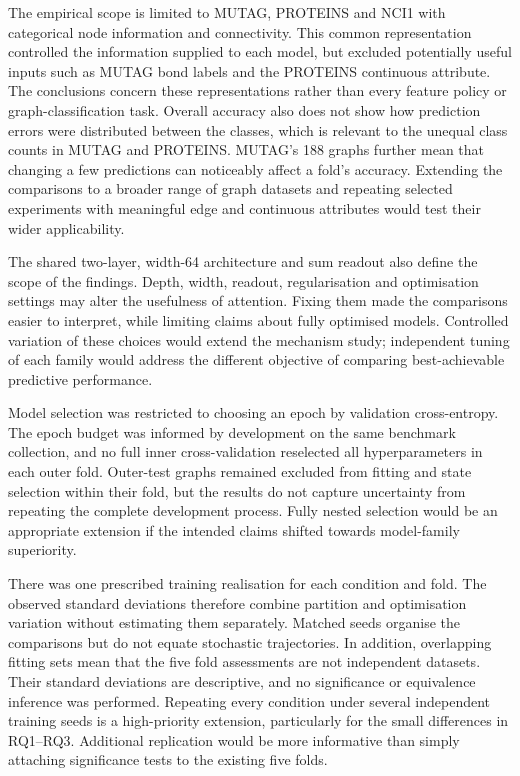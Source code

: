 \documentclass[11pt,a4paper]{article}
\begin{document}
The empirical scope is limited to MUTAG, PROTEINS and NCI1 with categorical node information and connectivity. This common representation controlled the information supplied to each model, but excluded potentially useful inputs such as MUTAG bond labels and the PROTEINS continuous attribute. The conclusions concern these representations rather than every feature policy or graph-classification task. Overall accuracy also does not show how prediction errors were distributed between the classes, which is relevant to the unequal class counts in MUTAG and PROTEINS. MUTAG's 188 graphs further mean that changing a few predictions can noticeably affect a fold's accuracy. Extending the comparisons to a broader range of graph datasets and repeating selected experiments with meaningful edge and continuous attributes would test their wider applicability.

The shared two-layer, width-64 architecture and sum readout also define the scope of the findings. Depth, width, readout, regularisation and optimisation settings may alter the usefulness of attention. Fixing them made the comparisons easier to interpret, while limiting claims about fully optimised models. Controlled variation of these choices would extend the mechanism study; independent tuning of each family would address the different objective of comparing best-achievable predictive performance.

Model selection was restricted to choosing an epoch by validation cross-entropy. The epoch budget was informed by development on the same benchmark collection, and no full inner cross-validation reselected all hyperparameters in each outer fold. Outer-test graphs remained excluded from fitting and state selection within their fold, but the results do not capture uncertainty from repeating the complete development process. Fully nested selection would be an appropriate extension if the intended claims shifted towards model-family superiority.

There was one prescribed training realisation for each condition and fold. The observed standard deviations therefore combine partition and optimisation variation without estimating them separately. Matched seeds organise the comparisons but do not equate stochastic trajectories. In addition, overlapping fitting sets mean that the five fold assessments are not independent datasets. Their standard deviations are descriptive, and no significance or equivalence inference was performed. Repeating every condition under several independent training seeds is a high-priority extension, particularly for the small differences in RQ1--RQ3. Additional replication would be more informative than simply attaching significance tests to the existing five folds.
\end{document}
